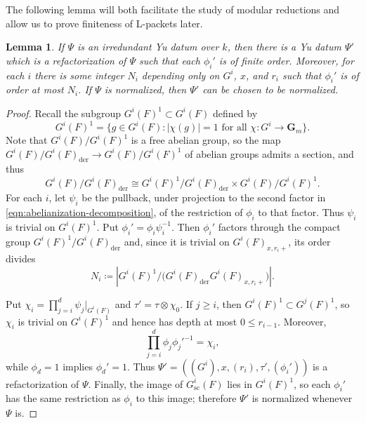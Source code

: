 \documentclass[reqno]{amsart}
\numberwithin{equation}{subsection}
\newcommand{\G}{\mathbf{G}}
\newcommand{\co}{\colon}
\DeclareMathOperator{\der}{der}
\newtheorem{lemma}[thm]{Lemma}
\theoremstyle{remark}
\numberwithin{equation}{subsection}
\numberwithin{figure}{subsection}
\begin{document}
The following lemma will both facilitate the study of modular reductions and allow us to prove finiteness of L-packets later.

\begin{lemma}\label{lemma:yu-datum-finite-order}
If $\Psi$ is an irredundant Yu datum over $k$, then there is a Yu datum $\Psi'$ which is a refactorization of $\Psi$ such that each $\phi_i'$ is of finite order. Moreover, for each $i$ there is some integer $N_i$ depending only on $G^i$, $x$, and $r_i$ such that $\phi_i'$ is of order at most $N_i$. If $\Psi$ is normalized, then $\Psi'$ can be chosen to be normalized. %
\end{lemma}

\begin{proof}
Recall the subgroup $G^i(F)^1 \subset G^i(F)$ defined by
\[
G^i(F)^1 = \{g \in G^i(F)\co |\chi(g)| = 1 \text{ for all } \chi\co G^i \to \G_m\}.
\]
Note that $G^i(F)/G^i(F)^1$ is a free abelian group, so the map $G^i(F)/G^i(F)_{\der} \to G^i(F)/G^i(F)^1$ of abelian groups admits a section, and thus
\begin{equation}\label{eqn:abelianization-decomposition}
G^i(F)/G^i(F)_{\der} \cong G^i(F)^1/G^i(F)_{\der} \times G^i(F)/G^i(F)^1.
\end{equation}
For each $i$, let $\psi_i$ be the pullback, under projection to the second factor in \eqref{eqn:abelianization-decomposition}, of the restriction of $\phi_i$ to that factor. Thus $\psi_i$ is trivial on $G^i(F)^1$. Put $\phi_i'=\phi_i\psi_i^{-1}$. Then $\phi_i'$ factors through the compact group $G^i(F)^1/G^i(F)_{\der}$ and, since it is trivial on $G^i(F)_{x,r_i+}$, its order divides
\[
N_i\coloneqq\left|G^i(F)^1/\bigl(G^i(F)_{\der}G^i(F)_{x,r_i+}\bigr)\right|.
\]

Put $\chi_i=\prod_{j=i}^d\psi_j|_{G^i(F)}$ and $\tau'=\tau\otimes\chi_0$. If $j\geq i$, then $G^i(F)^1\subset G^j(F)^1$, so $\chi_i$ is trivial on $G^i(F)^1$ and hence has depth at most $0\leq r_{i-1}$. Moreover,
\[
\prod_{j=i}^d\phi_j\phi_j'^{-1}=\chi_i,
\]
while $\phi_d=1$ implies $\phi_d'=1$. Thus $\Psi' = ((G^i), x, (r_i), \tau', (\phi_i'))$ is a refactorization of $\Psi$. Finally, the image of $G^i_{\mathrm{sc}}(F)$ lies in $G^i(F)^1$, so each $\phi_i'$ has the same restriction as $\phi_i$ to this image; therefore $\Psi'$ is normalized whenever $\Psi$ is. %
\end{proof}
\end{document}
